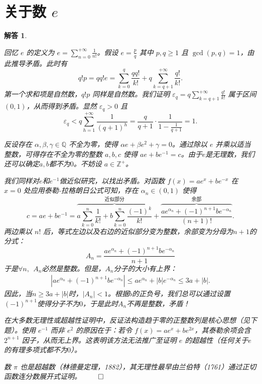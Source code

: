 \documentclass[12pt,UTF8,fontset=none]{ctexbook}
\theoremstyle{exercisestyle}
\theoremstyle{solutionstyle}
\newtheorem*{solution*}{解答}
\newenvironment{solution}
  {\begin{solution*}}
  {\hfill\ensuremath{\qed}\end{solution*}}
\begin{document}
\section{关于数 $e$}
\begin{solution}
  \begin{subquestions}
    \item 回忆 $e$ 的定义为 $e = \sum_{n=0}^{+\infty} \frac{1}{n!}$。假设 $e = \frac{p}{q}$ 其中 $p, q \geqslant 1$ 且 $\gcd(p,q) = 1$，由此推导矛盾。此时有
    $$
    q!p = qq!e = \sum_{k=0}^{q} \frac{qq!}{k!} + q \sum_{k=q+1}^{+\infty} \frac{q!}{k!}.
    $$
    第一个求和项是自然数，$q!p$ 同样是自然数。我们证明 $\varepsilon_q = q \sum_{k=q+1}^{+\infty} \frac{q!}{k!}$ 属于区间 $(0,1)$，从而得到矛盾。显然 $\varepsilon_q > 0$ 且
    $$
    \varepsilon_q < q \sum_{h=1}^{+\infty} \frac{1}{(q+1)^h} = \frac{q}{q+1} \cdot \frac{1}{1 - \frac{1}{q+1}} = 1.
    $$
    \item 反设存在 $\alpha, \beta, \gamma \in \mathbb{Q}$ 不全为零，使得 $\alpha e + \beta e^2 + \gamma = 0$。通过除以 $e$ 并乘以适当整数，可得存在不全为零的整数 $a, b, c$ 使得 $ae + be^{-1} = c$。由于$e$是无理数，我们还可以确定$a,b$都不为$0$。不妨设 $a \in \mathbb{Z}^+$。
    
    我们同样对$e$和$e^{-1}$做近似研究，以找出矛盾。对函数 $f(x) = ae^x + be^{-x}$ 在 $x=0$ 处应用泰勒-拉格朗日公式可知，存在 $\alpha_n \in (0,1)$ 使得
    $$
    c = ae + be^{-1} = \overbrace{a \sum_{k=0}^{n} \frac{1}{k!} + b \sum_{k=0}^{n} \frac{(-1)^k}{k!}}^{\text{近似部分}} + \overbrace{\frac{ae^{\alpha_n} + (-1)^{n+1}be^{-\alpha_n}}{(n+1)!}}^{\text{余部}}.
    $$
    两边乘以 $n!$ 后，等式左边以及右边的近似部分变为整数，余部变为分母为$n+1$的分式：
    $$A_n = \frac{ae^{\alpha_n} + (-1)^{n+1}be^{-\alpha_n}}{n+1}$$ 
    于是$\forall n,\;\,A_n$必然是整数。但是，$A_n$分子的大小有上界：
    \begin{align*}
        \left|ae^{\alpha_n} + (-1)^{n+1}be^{-\alpha_n}\right| \leqslant ae^{\alpha_n} + |b|e^{-\alpha_n} \leqslant 3a + |b|.
    \end{align*}
    因此，当$n \geqslant 3a + |b|$时，$|A_n| < 1$。根据$b$的正负号，我们总可以通过设置$(-1)^{n+1}$使得分子不为$0$，于是此时$A_n$不再是整数，矛盾！
  \end{subquestions}
  
  在大多数无理性或超越性证明中，反证法构造趋于零的正整数列是核心思想（见下题）。使用 $e^{-1}$ 而非 $e^2$ 的原因在于：若令 $f(x) = ae^x + be^{2x}$，其泰勒余项会含 $2^{n+1}$ 因子，从而无上界。这表明该方法无法推广至证明 $e$ 的超越性（任何关于$e$的有理多项式都不为$0$）。
  
  数 $\pi$ 也是超越数（林德曼定理，1882），其无理性最早由兰伯特（1761）通过正切函数连分数展开式证明。
\end{solution}
\end{document}

